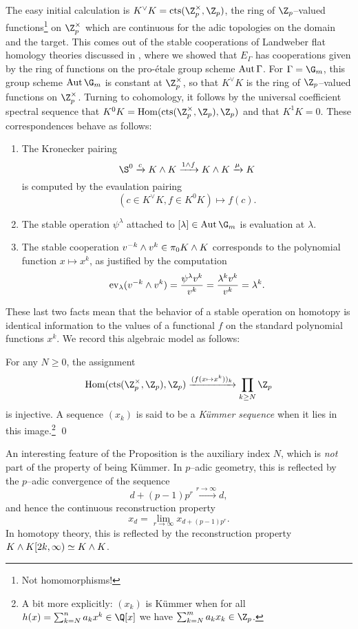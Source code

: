 The easy initial calculation is $K^\vee K = \cts(\Z_p^\times, \Z_p)$, the ring of $\Z_p$--valued functions\footnote{Not homomorphisms!} on $\Z_p^\times$ which are continuous for the adic topologies on the domain and the target.  This comes out of the stable cooperations of Landweber flat homology theories discussed in , where we showed that $E_\Gamma$ has cooperations given by the ring of functions on the pro-\'etale group scheme $\operatorname{Aut} \Gamma$.  For $\Gamma = \G_m$, this group scheme $\Aut \G_m$ is constant at $\Z_p^\times$, so that $K^\vee K$ is the ring of $\Z_p$--valued functions on $\Z_p^\times$.  Turning to cohomology, it follows by the universal coefficient spectral sequence that $K^0 K = \Hom(\cts(\Z_p^\times, \Z_p), \Z_p)$ and that $K^1 K = 0$.  These correspondences behave as follows:
\begin{enumerate}
    \item The Kronecker pairing \[\S^0 \xrightarrow{c} K \sm K \xrightarrow{1 \sm f} K \sm K \xrightarrow{\mu} K\] is computed by the evaulation pairing \[(c \in K^\vee K, f \in K^0 K) \mapsto f(c).\]
    \item The stable operation $\psi^\lambda$ attached to $[\lambda] \in \Aut \G_m$ is evaluation at $\lambda$.
    \item The stable cooperation $v^{-k} \wedge v^k \in \pi_0 K \wedge K$ corresponds to the polynomial function $x \mapsto x^k$, as justified by the computation \[\operatorname{ev}_{\lambda}(v^{-k} \wedge v^k) = \frac{\psi^\lambda v^k}{v^k} = \frac{\lambda^k v^k}{v^k} = \lambda^k.\]
\end{enumerate}

\noindent These last two facts mean that the behavior of a stable operation on homotopy is identical information to the values of a functional $f$ on the standard polynomial functions $x^k$.  We record this algebraic model as follows:
\begin{proposition}
For any $N \ge 0$, the assignment \[\Hom(\cts(\Z_p^\times, \Z_p), \Z_p) \xrightarrow{(f(x \mapsto x^k))_k} \prod_{k \ge N} \Z_p\] is injective.  A sequence $(x_k)$ is said to be a \emph{K\"ummer sequence} when it lies in this image.\footnote{A bit more explicitly: $(x_k)$ is K\"ummer when for all $h(x) = \sum_{k=N}^n a_k x^k \in \Q[x]$ we have $\sum_{k=N}^m a_k x_k \in \Z_p$.} \qed
\end{proposition}

\begin{remark}
An interesting feature of the Proposition is the auxiliary index $N$, which is \emph{not} part of the property of being K\"ummer.  In $p$--adic geometry, this is reflected by the $p$--adic convergence of the sequence \[d + (p-1)p^r \xrightarrow{r \to \infty} d,\] and hence the continuous reconstruction property \[x_d = \lim_{r \to \infty} x_{d + (p-1)p^r}.\]  In homotopy theory, this is reflected by the reconstruction property $K \wedge K[2k, \infty) \simeq K \wedge K$.
\end{remark}

